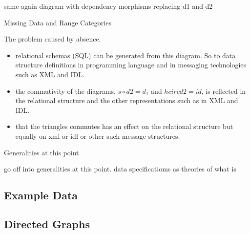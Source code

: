 \begin{frame}
same again diagram with dependency morphisms replacing d1 and d2
\end{frame}

\begin{frame}{Missing Data and Range Categories}
\end{frame}

\begin{frame}{The problem caused by absence.}
\begin{itemize}
\item relational schemas (SQL) can be generated from this diagram. So to data structure definitions in programming language and in messaging technologies such as XML and IDL. 
\item the commutivity of the diagrams, $s \circ d2 = d_1$ and $h circ d2 =id$, is reflected in the relational structure and the other representations such as in XML and IDL.  
\item that the triangles commutes has an effect on the relational structure but equally on xml or idl or other such message structures. 
\end{itemize}
\end{frame}

\begin{frame}{Generalities at this point}

go off into generalities at this point. data specificatioms as theories of what is
\end{frame}


\iffalse
\subsection{Preamble}


\subsection{Introduction}

\fi

\iffalse
\subsection{Example Data}


\subsection{Directed Graphs}


